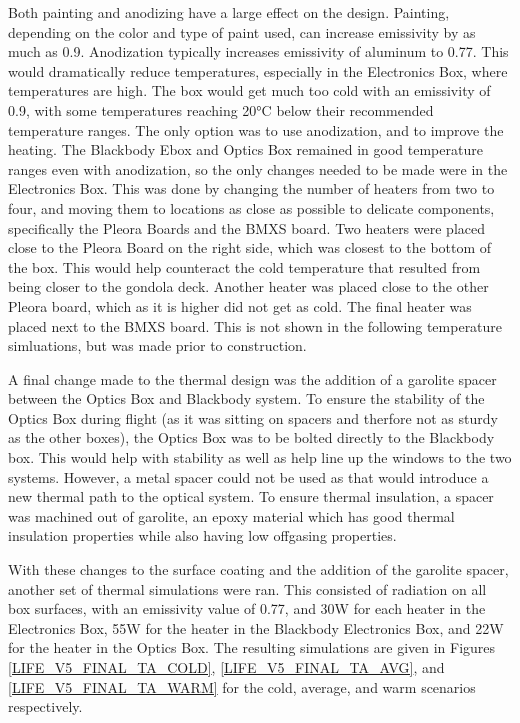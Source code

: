 Both painting and anodizing have a large effect on the design. Painting, depending on the color and type of paint used, can increase emissivity by as much as 0.9. Anodization typically increases emissivity of aluminum to 0.77. This would dramatically reduce temperatures, especially in the Electronics Box, where temperatures are high. The box would get much too cold with an emissivity of 0.9, with some temperatures reaching 20°C below their recommended temperature ranges. The only option was to use anodization, and to improve the heating. The Blackbody Ebox and Optics Box remained in good temperature ranges even with anodization, so the only changes needed to be made were in the Electronics Box. This was done by changing the number of heaters from two to four, and moving them to locations as close as possible to delicate components, specifically the Pleora Boards and the BMXS board. Two heaters were placed close to the Pleora Board on the right side, which was closest to the bottom of the box. This would help counteract the cold temperature that resulted from being closer to the gondola deck. Another heater was placed close to the other Pleora board, which as it is higher did not get as cold. The final heater was placed next to the BMXS board. This is not shown in the following temperature simluations, but was made prior to construction.

A final change made to the thermal design was the addition of a garolite spacer between the Optics Box and Blackbody system. To ensure the stability of the Optics Box during flight (as it was sitting on spacers and therfore not as sturdy as the other boxes), the Optics Box was to be bolted directly to the Blackbody box. This would help with stability as well as help line up the windows to the two systems. However, a metal spacer could not be used as that would introduce a new thermal path to the optical system. To ensure thermal insulation, a spacer was machined out of garolite, an epoxy material which has good thermal insulation properties while also having low offgasing properties.

With these changes to the surface coating and the addition of the garolite spacer, another set of thermal simulations were ran. This consisted of radiation on all box surfaces, with an emissivity value of 0.77, and 30W for each heater in the Electronics Box, 55W for the heater in the Blackbody Electronics Box, and 22W for the heater in the Optics Box. The resulting simulations are given in Figures \ref{LIFE_V5_FINAL_TA_COLD}, \ref{LIFE_V5_FINAL_TA_AVG}, and \ref{LIFE_V5_FINAL_TA_WARM} for the cold, average, and warm scenarios respectively. 

